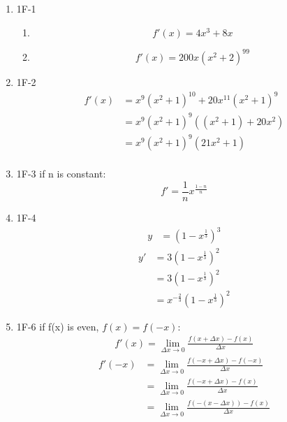 \documentclass{article}
\begin{document}
\begin{enumerate}
\item 1F-1
    \begin{enumerate}
        \item 
        \begin{equation*}
            f'(x) = 4x^3+8x
         \end{equation*}

        \item 
        \begin{equation*}
        f'(x) = 200x(x^2 + 2)^{99}
        \end{equation*}
    \end{enumerate}    
\item 1F-2
    \begin{align*}
        f'(x) &= x^9(x^2+1)^{10} + 20x^{11}(x^2+1)^9 \\
        &= x^9(x^2+1)^9((x^2+1) + 20x^2) \\
        &= x^9(x^2+1)^9(21x^2+1) \\
    \end{align*}
\item 1F-3
    if n is constant:
    \begin{equation*}
        f' = \frac{1}{n} x ^ \frac{1-n}{n}
    \end{equation*}
\item 1F-4
    \begin{align*}
        y &= (1 - x^{\frac{1}{3}})^3
    \end{align*}
    \begin{align*}
        y' &= 3(1-x^{\frac{1}{3}})^2 \\
        &= 3(1-x^{\frac{1}{3}})^2 \\
        &= x^{-\frac{2}{3}}(1-x^{\frac{1}{3}})^2
    \end{align*}
\item 1F-6
    if f(x) is even, $f(x) = f(-x)$:
    \begin{align*}
        f'(x) = \lim_{\Delta x \to 0} \frac{f(x+\Delta x) - f(x)}{\Delta x}
    \end{align*}
    \begin{align*}
        f'(-x) &= \lim_{\Delta x \to 0} \frac{f(-x+\Delta x) - f(-x)}{\Delta x} \\
                &= \lim_{\Delta x \to 0} \frac{f(-x+\Delta x) - f(x)}{\Delta x} \\
                &= \lim_{\Delta x \to 0} \frac{f(-(x-\Delta x)) - f(x)}{\Delta x} \\

\end{align*}
\end{enumerate}
\end{document}
